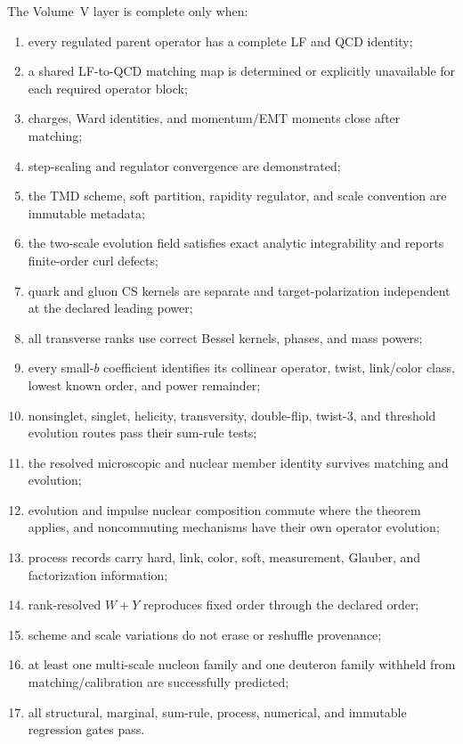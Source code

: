 \documentclass[11pt]{article}
\begin{document}
The Volume~V layer is complete only when:
\begin{enumerate}
\item every regulated parent operator has a complete LF and QCD identity;
\item a shared LF-to-QCD matching map is determined or explicitly unavailable
      for each required operator block;
\item charges, Ward identities, and momentum/EMT moments close after matching;
\item step-scaling and regulator convergence are demonstrated;
\item the TMD scheme, soft partition, rapidity regulator, and scale convention
      are immutable metadata;
\item the two-scale evolution field satisfies exact analytic integrability and
      reports finite-order curl defects;
\item quark and gluon CS kernels are separate and target-polarization
      independent at the declared leading power;
\item all transverse ranks use correct Bessel kernels, phases, and mass powers;
\item every small-\(b\) coefficient identifies its collinear operator, twist,
      link/color class, lowest known order, and power remainder;
\item nonsinglet, singlet, helicity, transversity, double-flip, twist-3, and
      threshold evolution routes pass their sum-rule tests;
\item the resolved microscopic and nuclear member identity survives matching
      and evolution;
\item evolution and impulse nuclear composition commute where the theorem
      applies, and noncommuting mechanisms have their own operator evolution;
\item process records carry hard, link, color, soft, measurement, Glauber, and
      factorization information;
\item rank-resolved \(W+Y\) reproduces fixed order through the declared order;
\item scheme and scale variations do not erase or reshuffle provenance;
\item at least one multi-scale nucleon family and one deuteron family withheld
      from matching/calibration are successfully predicted;
\item all structural, marginal, sum-rule, process, numerical, and immutable
      regression gates pass.
\end{enumerate}
\end{document}
